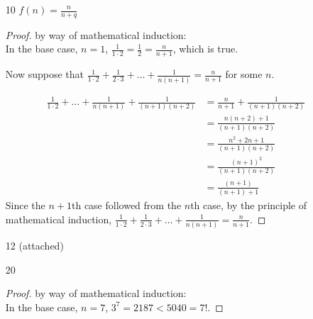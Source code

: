 \documentclass{article}
\begin{document}
\begin{enumerate}
    \begin{proof} by way of mathematical induction:\\
      When $n=1$, $1 \cdot 1! = 1 = (1+1)!-1$, which is true.

      Now suppose that $1 \cdot 1! + 2 \cdot 2! + \dots + n \cdot n! = (n+1)! - 1$
      for some $n$.
      \begin{align*}
        1 \cdot 1! + \dots + n \cdot n! + (n+1)(n+1)!
        &= (n+1)! - 1 + (n+1)(n+1)!\\
        &= 1(n+1)! + (n+1)(n+1)! - 1\\
        &= (n+2)(n+1)! -1\\
        &= (n+2)! - 1\\
        &= ((n+1) + 1)! -1
      \end{align*}

      Since the $n+1$th case followed from the $n$th case, by the principle
      of mathematical induction,
      $1 \cdot 1! + 2 \cdot 2! + \dots + n \cdot n! = (n+1)! - 1$.
    \end{proof}
  \item[10] $f(n) = \frac{n}{n+q}$
    \begin{proof} by way of mathematical induction:\\
      In the base case, $n=1$, $\frac{1}{1\cdot2} = \frac{1}{2} = \frac{n}{n+1}$,
      which is true.

      Now suppose that $\frac{1}{1\cdot2} + \frac{1}{2\cdot3} + \dots +
      \frac{1}{n(n+1)} = \frac{n}{n+1}$ for some $n$. 

      \begin{align*}
        \frac{1}{1\cdot2}+\dots+\frac{1}{n(n+1)}+\frac{1}{(n+1)(n+2)}
        &= \frac{n}{n+1} + \frac{1}{(n+1)(n+2)}\\
        &= \frac{n(n+2)+1}{(n+1)(n+2)}\\
        &= \frac{n^2+2n+1}{(n+1)(n+2)}\\
        &= \frac{(n+1)^2}{(n+1)(n+2)}\\
        &= \frac{(n+1)}{(n+1) + 1}
      \end{align*}
      Since the $n+1$th case followed from the $n$th case, by the principle
      of mathematical induction, $\frac{1}{1\cdot2} + \frac{1}{2\cdot3} + \dots +
      \frac{1}{n(n+1)} = \frac{n}{n+1}$.
    \end{proof}
  \item[12] (attached)

  \item[20]
    \begin{proof} by way of mathematical induction:\\
      In the base case, $n=7$, $3^7=2187 < 5040 = 7!$.


\end{proof}
\end{enumerate}
\end{document}
